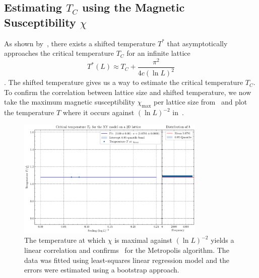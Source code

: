 	\subsection{Estimating $T_C$ using the Magnetic Susceptibility $\chi$}
		As shown by~\citet{shifted}, there exists a shifted temperature $T^*$ that asymptotically approaches the critical temperature $T_C$ for an infinite lattice
		\begin{equation}\label{eq:shifted_temperature}
			T^*(L) \approx T_C + \frac{\pi^2}{4c (\ln{L})^2}
		\end{equation}
		\cite[eq. 3]{shifted}. The shifted temperature gives us a way to estimate the critical temperature $T_C$. To confirm the correlation between lattice size and shifted temperature, we now take the maximum magnetic susceptibility $\chi_\text{max}$ per lattice size from~ and plot the temperature $T$ where it occurs against $(\ln{L})^{-2}$ in~.
		\begin{figure}[htbp]
			\centering
			\includegraphics[width=0.8\textwidth]{../figures/Metropolis/Critical_Temperature.pdf}
			\caption[Estimating $T_C$ using the Metropolis algorithm by plotting $T$ where $\chi$ is maximal against $(\ln L)^{-2}$]{The temperature at which $\chi$ is maximal against $(\ln L)^{-2}$ yields a linear correlation and confirms~ for the Metropolis algorithm. The data was fitted using least-squares linear regression model and the errors were estimated using a bootstrap approach.}
			\label{fig:critical_temperature}
		\end{figure}
